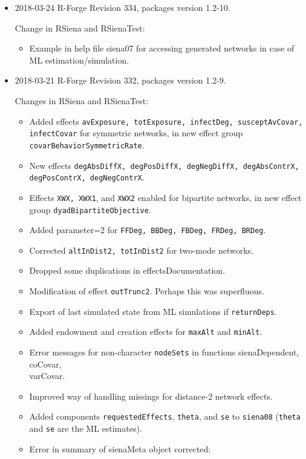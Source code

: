 \documentclass[a4paper,fleqn,11pt]{article}
\newcommand{\+}{\, + \,}
\newcommand{\sfn}[1]{\textsf{#1}}
\begin{document}
\begin{small}
\begin{itemize}
\item 2018-03-24 R-Forge Revision 334, packages version 1.2-10.

Change in RSiena and RSienaTest:
\begin{itemize}
   \item Example in help file \textsf{siena07} for accessing generated networks
   in case of ML estimation/simulation.
   \end{itemize}

\item 2018-03-21 R-Forge Revision 332, packages version 1.2-9.

Changes in RSiena and RSienaTest:
\begin{itemize}
   \item Added effects \texttt{avExposure, totExposure, infectDeg,
     susceptAvCovar, infectCovar} for symmetric networks, in
     new effect group \texttt{covarBehaviorSymmetricRate}.
   \item New effects \texttt{degAbsDiffX, degPosDiffX, degNegDiffX, degAbsContrX,
     degPosContrX, degNegContrX}.
   \item Effects \texttt{XWX, XWX1}, and \texttt{XWX2} enabled for
   bipartite networks, in
    new effect group \texttt{dyadBipartiteObjective}.
   \item Added parameter=2 for \texttt{FFDeg, BBDeg, FBDeg, FRDeg, BRDeg}.
   \item Corrected \texttt{altInDist2, totInDist2} for two-mode networks.
   \item Dropped some duplications in \sfn{effectsDocumentation}.
   \item Modification of effect \texttt{outTrunc2}.
     Perhaps this was superfluous.
   \item Export of last simulated state from ML simulations if
     \texttt{returnDeps}.
   \item Added endowment and creation effects for \texttt{maxAlt} and \texttt{minAlt}.
   \item Error messages for non-character \texttt{nodeSets} in functions
    \sfn{sienaDependent, coCovar,\\ varCovar}.
   \item Improved way of handling missings for distance-2 network effects.
   \item Added components \texttt{requestedEffects}, \texttt{theta}, and
    \texttt{se} to \texttt{siena08}
     (\texttt{theta} and \texttt{se} are the ML estimates).
   \item Error in summary of \sfn{sienaMeta} object corrected:

\end{itemize}
\end{itemize}
\end{small}
\end{document}
